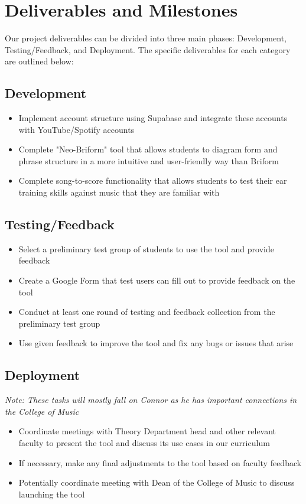 \documentclass[12pt, letterpaper]{article}
\begin{document}
\section*{Deliverables and Milestones}
Our project deliverables can be divided into three main phases: Development, Testing/Feedback, and Deployment.  The specific deliverables for each category are outlined below:

\subsection*{Development}
\begin{itemize}
    \item[--] Implement account structure using Supabase and integrate these accounts with YouTube/Spotify accounts
    \item[--] Complete "Neo-Briform" tool that allows students to diagram form and phrase structure in a more intuitive and user-friendly way than Briform
    \item[--] Complete song-to-score functionality that allows students to test their ear training skills against music that they are familiar with
\end{itemize}

\subsection*{Testing/Feedback}
\begin{itemize}
    \item[--] Select a preliminary test group of students to use the tool and provide feedback
    \item[--] Create a Google Form that test users can fill out to provide feedback on the tool
    \item[--] Conduct at least one round of testing and feedback collection from the preliminary test group
    \item[--] Use given feedback to improve the tool and fix any bugs or issues that arise
\end{itemize}

\subsection*{Deployment}
\textit{Note: These tasks will mostly fall on Connor as he has important connections in the College of Music}
\begin{itemize}
    \item[--] Coordinate meetings with Theory Department head and other relevant faculty to present the tool and discuss its use cases in our curriculum
    \item[--] If necessary, make any final adjustments to the tool based on faculty feedback
    \item[--] Potentially coordinate meeting with Dean of the College of Music to discuss launching the tool
\end{itemize}
\end{document}
